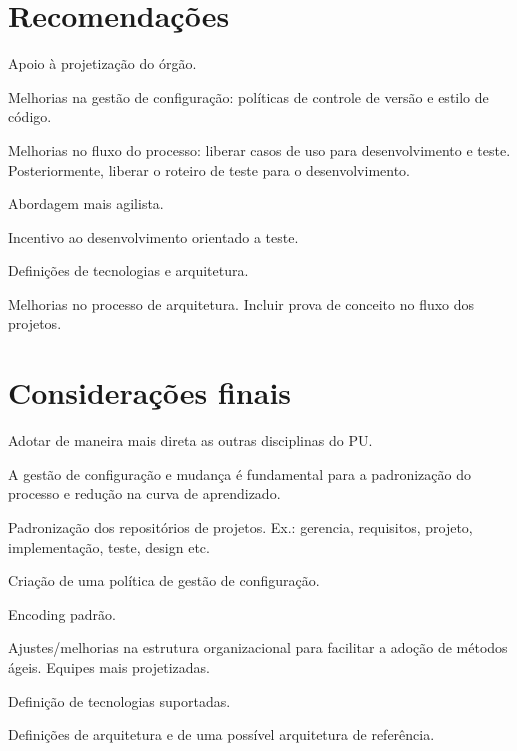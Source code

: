 \documentclass[
	article,			%
	11pt,				%
	oneside,			%
	a4paper,			%
	english,			%
	brazil,				%
	sumario=tradicional
	]{abntex2}
\begin{document}
\section{Recomendações}

Apoio à projetização do órgão.

Melhorias na gestão de configuração: políticas de controle de versão e estilo de
código.

Melhorias no fluxo do processo: liberar casos de uso para desenvolvimento e
teste. Posteriormente, liberar o roteiro de teste para o desenvolvimento.

Abordagem mais agilista.

Incentivo ao desenvolvimento  orientado a teste.

Definições de tecnologias e arquitetura.

Melhorias no processo de arquitetura. Incluir prova de conceito no fluxo dos
projetos.

% 

\section*{Considerações finais}

Adotar de maneira mais direta as outras disciplinas do PU.

A gestão de configuração e mudança é fundamental para a padronização do processo
e redução na curva de aprendizado.

Padronização dos repositórios de projetos. Ex.: gerencia, requisitos, projeto,
implementação, teste, design etc.

Criação de uma política de gestão de configuração.

Encoding padrão.

Ajustes/melhorias na estrutura organizacional para facilitar a adoção de
métodos ágeis. Equipes mais projetizadas.

Definição de tecnologias suportadas.

Definições de arquitetura e de uma possível arquitetura de referência.

\lipsum[1]

\begin{citacao}
\lipsum[2]
\end{citacao}

\lipsum[3]

\postextual



%
%
\end{document}
